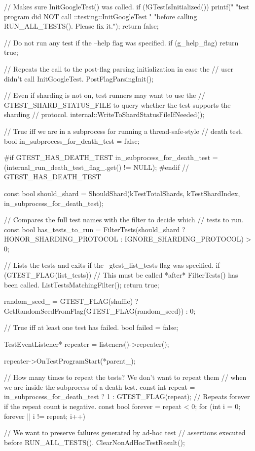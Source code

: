 \begin{DoxyCode}
                               {
  // Makes sure InitGoogleTest() was called.
  if (!GTestIsInitialized()) {
    printf("%
           "\nThis test program did NOT call ::testing::InitGoogleTest "
           "before calling RUN_ALL_TESTS().  Please fix it.\n");
    return false;
  }

  // Do not run any test if the --help flag was specified.
  if (g_help_flag)
    return true;

  // Repeats the call to the post-flag parsing initialization in case the
  // user didn't call InitGoogleTest.
  PostFlagParsingInit();

  // Even if sharding is not on, test runners may want to use the
  // GTEST_SHARD_STATUS_FILE to query whether the test supports the sharding
  // protocol.
  internal::WriteToShardStatusFileIfNeeded();

  // True iff we are in a subprocess for running a thread-safe-style
  // death test.
  bool in_subprocess_for_death_test = false;

#if GTEST_HAS_DEATH_TEST
  in_subprocess_for_death_test = (internal_run_death_test_flag_.get() != NULL);
#endif  // GTEST_HAS_DEATH_TEST

  const bool should_shard = ShouldShard(kTestTotalShards, kTestShardIndex,
                                        in_subprocess_for_death_test);

  // Compares the full test names with the filter to decide which
  // tests to run.
  const bool has_tests_to_run = FilterTests(should_shard
                                              ? HONOR_SHARDING_PROTOCOL
                                              : IGNORE_SHARDING_PROTOCOL) > 0;

  // Lists the tests and exits if the --gtest_list_tests flag was specified.
  if (GTEST_FLAG(list_tests)) {
    // This must be called *after* FilterTests() has been called.
    ListTestsMatchingFilter();
    return true;
  }

  random_seed_ = GTEST_FLAG(shuffle) ?
      GetRandomSeedFromFlag(GTEST_FLAG(random_seed)) : 0;

  // True iff at least one test has failed.
  bool failed = false;

  TestEventListener* repeater = listeners()->repeater();

  repeater->OnTestProgramStart(*parent_);

  // How many times to repeat the tests?  We don't want to repeat them
  // when we are inside the subprocess of a death test.
  const int repeat = in_subprocess_for_death_test ? 1 : GTEST_FLAG(repeat);
  // Repeats forever if the repeat count is negative.
  const bool forever = repeat < 0;
  for (int i = 0; forever || i != repeat; i++) {
    // We want to preserve failures generated by ad-hoc test
    // assertions executed before RUN_ALL_TESTS().
    ClearNonAdHocTestResult();

}}
\end{DoxyCode}
